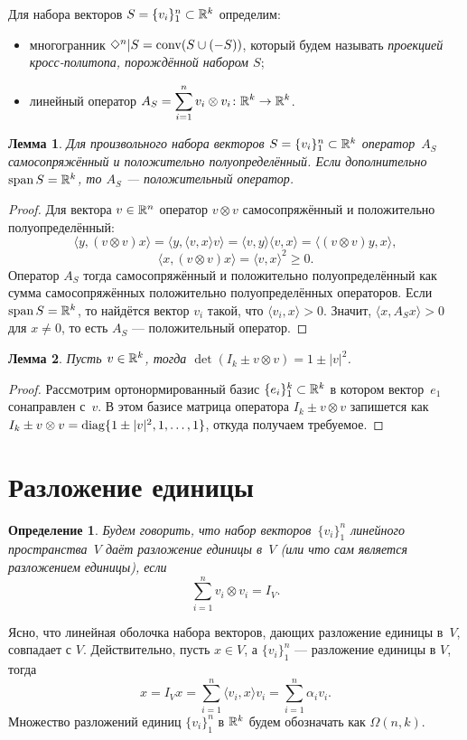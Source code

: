 \documentclass[a4paper,12pt]{article}
\def\co{\mathop{\rm conv}}
\def\span{\mathop{\rm span}}
\def\diag{\mathop{\rm diag}}
\newcommand{\crosp}{\Diamond}
\newcommand{\lb}[1]{#1\nobreak\discretionary{}{\hbox{\ensuremath{#1}}}{}}
\newtheorem{lem}{Лемма}[section]
\newtheorem*{defin*}{Определение}
\numberwithin{equation}{section}
\begin{document}
	Для набора векторов $S=\{v_i\}_1^n\subset\mathbb {R}^k$ определим:
		\begin{itemize}
			\item многогранник $\crosp^n|S=\co(S\cup (-S))$, который будем называть \textit{проекцией кросс-политопа, порождённой набором $S$};
			\item линейный оператор $A_S=\displaystyle\sum_{i=1}^n v_i\otimes v_i\colon\mathbb {R}^k\to\mathbb {R}^k$.
		\end{itemize}
	\begin{lem}\label{lem:as}
		Для произвольного набора векторов $S=\{v_i\}_1^n\subset\mathbb {R}^k$ оператор~$A_S$ самосопряжённый и положительно полуопределённый. Если дополнительно $\span S\lb=\RR^k$, то $A_S$ --- положительный оператор.
	\end{lem}
	\begin{proof}
		Для вектора $v\in\mathbb {R}^n$ оператор $v\otimes v$ самосопряжённый и положительно полуопределённый:
			$$\langle y, (v\otimes v) x\rangle=\langle y, \langle v,x\rangle v\rangle=\langle v,y\rangle\langle v,x\rangle=\langle (v\otimes v) y, x\rangle,$$
			$$\langle x, (v\otimes v) x\rangle=\langle v,x\rangle^2\geqslant 0.$$
		Оператор $A_S$ тогда самосопряжённый и положительно полуопределённый как сумма самосопряжённых положительно полуопределённых операторов. Если $\span S=\RR^k$, то найдётся вектор $v_i$ такой, что $\langle v_i, x\rangle>0$. Значит, $\langle x, A_Sx\rangle>0$ для $x\neq 0$, то есть $A_S$ --- положительный оператор.
	\end{proof}
	\begin{lem}\label{lem:det}
		Пусть $v\in\mathbb {R}^k$, тогда $\det(I_k\pm v\otimes v)=1\pm|v|^2$.
	\end{lem}
	\begin{proof}
		Рассмотрим ортонормированный базис $\{e_i\}_1^k\subset\mathbb {R}^k$ в котором вектор~$e_1$ сонаправлен с~$v$. В этом базисе матрица оператора $I_k\pm v\otimes v$ запишется как $I_k\pm v\otimes v=\diag\{1\pm|v|^2,1,\ldots,1\}$, откуда получаем требуемое.
	\end{proof}

	\section{Разложение единицы}
	\begin{defin*}
		Будем говорить, что набор векторов~$\{v_i\}_1^n$ линейного пространства~$V$ даёт \textit{разложение единицы в}~$V$ (или что сам является \textit{разложением единицы}), если
		$$\sum_{i=1}^n v_i\otimes v_i=I_V.$$
	\end{defin*}
	Ясно, что линейная оболочка набора векторов, дающих разложение единицы в~$V$, совпадает с $V$. Действительно, пусть $x\in V$, а $\{v_i\}_1^n$ --- разложение единицы в $V$, тогда
		$$x=I_Vx=\sum_{i=1}^n \langle v_i,x\rangle v_i=\sum_{i=1}^n \alpha_iv_i.$$
	Множество разложений единиц $\{v_i\}_1^n$ в $\mathbb {R}^k$ будем обозначать как $\Omega(n,k)$.
\end{document}

